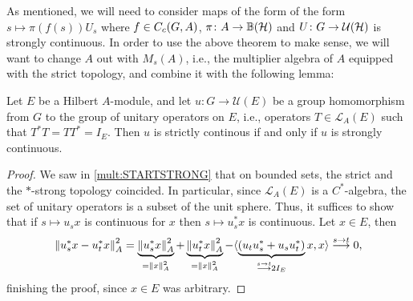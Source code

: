 As mentioned, we will need to consider maps of the form of the form $s \mapsto \pi(f(s)) U_s$ where $f \in C_c(G,A)$, $\pi\colon  A \to \mathbb{B}(\mathcal{H})$ and $U \colon G \to \mathcal{U}(\mathcal{H})$ is strongly continuous. In order to use the above theorem to make sense, we will want to change $A$ out with $M_s(A)$, i.e., the multiplier algebra of $A$ equipped with the strict topology, and combine it with the following lemma:
\begin{lemma}
Let $E$ be a Hilbert $A$-module, and let $u \colon G \to \mathcal{U}(E)$ be a group homomorphism from $G$ to the group of unitary operators on $E$, i.e., operators $T \in \mathcal{L}_A(E)$ such that $T^*T=TT^*=I_E$. Then $u$ is strictly continous if and only if $u$ is strongly continuous.
\label{int:unistrictstrong}
\end{lemma}
\begin{proof}
We saw in \cref{mult:STARTSTRONG} that on bounded sets, the strict and the $*$-strong topology coincided. In particular, since $\mathcal{L}_A(E)$ is a $C^*$-algebra, the set of unitary operators is a subset of the unit sphere. Thus, it suffices to show that if $s \mapsto u_s x$ is continuous for $x$ then $s \mapsto u_s^* x$ is continuous. Let $x \in E$, then
\begin{align*}
	\left\lVert u_s^* x - u_t^*x \right\rVert_A^2 = \underbrace{\left\lVert u_s^* x \right\rVert_A^2}_{= \left\lVert x \right\rVert_A^2} + \underbrace{\left\lVert u_t^*x \right\rVert_A^2}_{= \left\lVert x \right\rVert_A^2} - \langle \underbrace{ \left( u_t u_s^* + u_s u_t^*  \right)}_{\stackrel{s \to t}{\longrightarrow} 2I_E} x ,x \rangle \stackrel{s \to t}{\longrightarrow} 0,
\end{align*}
finishing the proof, since $x \in E$ was arbitrary.
\end{proof}

